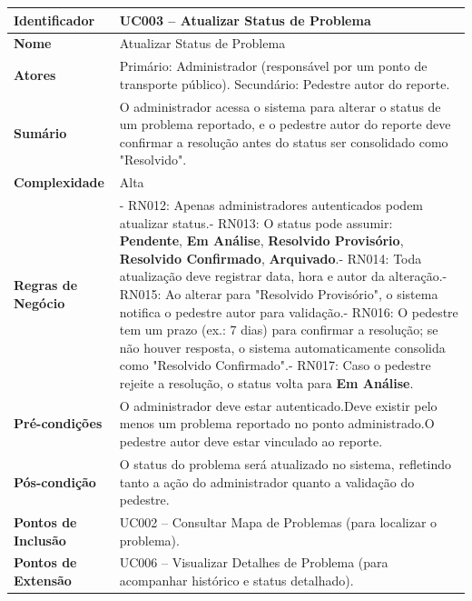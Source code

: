 \documentclass[12pt,a4paper]{article}
\begin{document}
\begin{longtable}{|p{3.5cm}|p{10cm}|}
\hline
\textbf{Identificador} & UC003 – Atualizar Status de Problema \\
\hline
\textbf{Nome} & Atualizar Status de Problema \\
\hline
\textbf{Atores} & Primário: Administrador (responsável por um ponto de transporte público). \newline Secundário: Pedestre autor do reporte. \\
\hline
\textbf{Sumário} & O administrador acessa o sistema para alterar o status de um problema reportado, e o pedestre autor do reporte deve confirmar a resolução antes do status ser consolidado como "Resolvido". \\
\hline
\textbf{Complexidade} & Alta \\
\hline
\textbf{Regras de Negócio} & - RN012: Apenas administradores autenticados podem atualizar status.\newline - RN013: O status pode assumir: \textbf{Pendente}, \textbf{Em Análise}, \textbf{Resolvido Provisório}, \textbf{Resolvido Confirmado}, \textbf{Arquivado}.\newline - RN014: Toda atualização deve registrar data, hora e autor da alteração.\newline - RN015: Ao alterar para "Resolvido Provisório", o sistema notifica o pedestre autor para validação.\newline - RN016: O pedestre tem um prazo (ex.: 7 dias) para confirmar a resolução; se não houver resposta, o sistema automaticamente consolida como "Resolvido Confirmado".\newline - RN017: Caso o pedestre rejeite a resolução, o status volta para \textbf{Em Análise}. \\
\hline
\textbf{Pré-condições} & O administrador deve estar autenticado.\newline Deve existir pelo menos um problema reportado no ponto administrado.\newline O pedestre autor deve estar vinculado ao reporte. \\
\hline
\textbf{Pós-condição} & O status do problema será atualizado no sistema, refletindo tanto a ação do administrador quanto a validação do pedestre. \\
\hline
\textbf{Pontos de Inclusão} & UC002 – Consultar Mapa de Problemas (para localizar o problema). \\
\hline
\textbf{Pontos de Extensão} & UC006 – Visualizar Detalhes de Problema (para acompanhar histórico e status detalhado). \\
\hline
\end{longtable}
\end{document}
